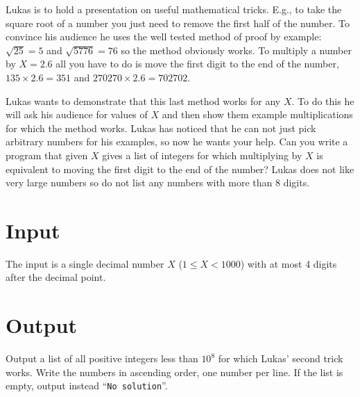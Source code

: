 
Lukas is to hold a presentation on useful mathematical tricks. E.g., to take the square root of a number you just need to remove the first half of the number. To convince his audience he uses the well tested method of proof by example: $\sqrt{25} = 5$ and $\sqrt{5776} = 76$ so the method obviously works. To multiply a number by $X = 2.6$ all you have to do is move the first digit to the end of the number, $135\times 2.6 = 351$ and $270270\times 2.6 = 702702$.

Lukas wants to demonstrate that this last method works for any $X$. To do this he will ask his audience for values of $X$ and then show them example multiplications for which the method works. Lukas has noticed that he can not just pick arbitrary numbers for his examples, so now he wants your help. Can you write a program that given $X$ gives a list of integers for which multiplying by $X$ is equivalent to moving the first digit to the end of the number? Lukas does not like very large numbers so do not list any numbers with more than 8 digits.

\section*{Input}
The input is a single decimal number $X$ ($1\leq X < 1000$) with at most 4 digits after the decimal point.

\section*{Output}
Output a list of all positive integers less than $10^8$ for which Lukas' second trick works. Write
the numbers in ascending order, one number per line. If the list is empty, output instead
``\texttt{No solution}''.
